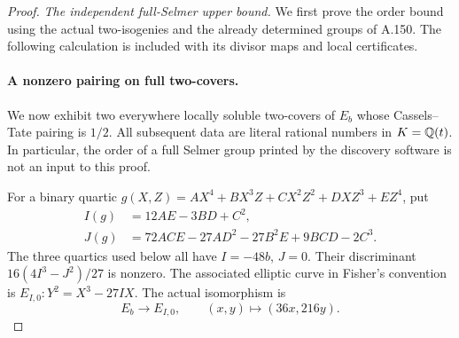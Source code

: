 \begin{proof}
\emph{The independent full-Selmer upper bound.}
We first prove the order bound using the actual two-isogenies
and the already determined groups of A.150.  The following
calculation is included with its divisor maps and local
certificates.



\paragraph{A nonzero pairing on full two-covers.}
We now exhibit two everywhere locally soluble two-covers of
\(E_b\) whose Cassels--Tate pairing is \(1/2\).
All subsequent data are literal rational numbers in
\(K=\mathbb Q(t)\).  In particular, the order of a full Selmer
group printed by the discovery software is not an input
to this proof.

For a binary quartic
\(g(X,Z)=AX^4+BX^3Z+CX^2Z^2+DXZ^3+EZ^4\), put
\[
 \begin{split}
 I(g)&=12AE-3BD+C^2,\\
 J(g)&=72ACE-27AD^2-27B^2E+9BCD-2C^3.
 \end{split}
\tag{A.154.5}
\]
The three quartics used below all have
\(I=-48b\), \(J=0\).  Their discriminant
\(16(4I^3-J^2)/27\) is nonzero.
The associated elliptic curve in Fisher's convention is
\(E_{I,0}:Y^2=X^3-27IX\).  The actual isomorphism is
\[
 E_b\longrightarrow E_{I,0},\qquad
               (x,y)\longmapsto(36x,216y).
\tag{A.154.6}
\]


\end{proof}
